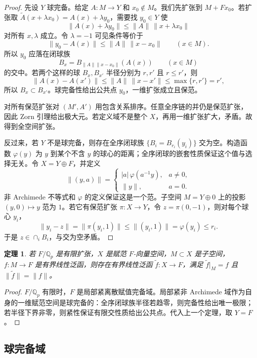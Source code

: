 \documentclass[11pt,a4paper,openany]{ctexbook}
\numberwithin{equation}{chapter}
\newcommand{\Q}{\mathbb{Q}}
\theoremstyle{plain}
\newtheorem{theorem}{定理}[chapter]
\theoremstyle{definition}
\theoremstyle{remark}
\begin{document}
\begin{proof}
先设 $Y$ 球完备。给定 $A:M\to Y$ 和 $x_0\notin M$。我们先扩张到 $M+Fx_0$。若扩张取 $\widetilde A(x+\lambda x_0)=A(x)+\lambda y_0$，需要找 $y_0\in Y$ 使
\[
  \|A(x)+\lambda y_0\|\le \|A\|\,\|x+\lambda x_0\|
\]
对所有 $x,\lambda$ 成立。令 $\lambda=-1$ 可见条件等价于
\[
  \|y_0-A(x)\|\le \|A\|\,\|x-x_0\|\qquad(x\in M).
\]
所以 $y_0$ 应落在闭球族
\[
  B_x=B_{\|A\|\|x-x_0\|}(A(x))\qquad(x\in M)
\]
的交中。若两个这样的球 $B_x,B_{x'}$ 半径分别为 $r,r'$ 且 $r\le r'$，则
\[
  \|A(x)-A(x')\|\le \|A\|\,\|x-x'\|
  \le \max\{r,r'\}=r',
\]
所以 $B_x\subset B_{x'}$。球完备性给出公共点 $y_0$，一维扩张成立且保范。

对所有保范扩张对 $(M',A')$ 用包含关系排序。任意全序链的并仍是保范扩张，因此 Zorn 引理给出极大元。若定义域不是整个 $X$，再用一维扩张扩大，矛盾。故得到全空间扩张。

反过来，若 $Y$ 不是球完备，则存在全序闭球族 $\{B_i=B_{r_i}(y_i)\}$ 交为空。构造函数 $\varphi(y)$ 为 $y$ 到某个不含 $y$ 的球心的距离；全序闭球的嵌套性质保证这个值与选择无关。令 $X=Y\oplus F$，并定义
\[
  \|(y,a)\|=
  \begin{cases}
    |a|\,\varphi(a^{-1}y),& a\ne0,\\
    \|y\|,& a=0.
  \end{cases}
\]
非 Archimede 不等式和 $\varphi$ 的定义保证这是一个范。子空间 $M=Y\oplus0$ 上的投影 $(y,0)\mapsto y$ 范为 $1$。若它有保范扩张 $\pi:X\to Y$，令 $z=\pi(0,-1)$，则对每个球心 $y_i$，
\[
  \|y_i-z\|=\|\pi(y_i,1)\|\le \|(y_i,1)\|=\varphi(y_i)\le r_i.
\]
于是 $z\in\cap_iB_i$，与交为空矛盾。
\end{proof}

\begin{theorem}
若 $F/\Q_p$ 是有限扩张，$X$ 是赋范 $F$-向量空间，$M\subset X$ 是子空间，$f:M\to F$ 是有界线性泛函，则存在有界线性泛函 $\widetilde f:X\to F$，满足 $\widetilde f|_M=f$ 且 $\|\widetilde f\|=\|f\|$。
\end{theorem}

\begin{proof}
$F/\Q_p$ 有限时，$F$ 是局部紧离散赋值完备域。局部紧非 Archimede 域作为自身的一维赋范空间是球完备的：全序闭球族半径若趋零，则完备性给出唯一极限；若半径下界非零，则紧性保证有限交性质给出公共点。代入上一个定理，取 $Y=F$。
\end{proof}

\subsection{球完备域}
\end{document}
